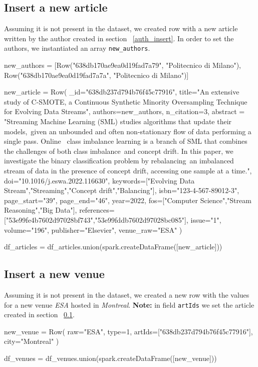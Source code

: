 \documentclass{Configuration_Files/PoliMi3i_thesis}
\begin{document}
\subsection{Insert a new article}
\label{pub_insert}
Assuming it is not present in the dataset, we created row with a new article written by the author created
in section ~\ref{auth_insert}. In order to set the authors, we instantiated an array \verb |new_authors|.\newline
\begin{python}
new_authors =  [Row("638db170ae9ea0d19fad7a79", "Politecnico di Milano"), Row("638db170ae9ea0d19fad7a7a", "Politecnico di Milano")]

new_article = Row(
    _id="638db237d794b76f45c77916",
    title="An extensive study of C-SMOTE, a Continuous Synthetic Minority Oversampling Technique for Evolving Data Streams",
    authors=new_authors,
    n_citation=3,
    abstract = "Streaming Machine Learning (SML) studies algorithms that update their models,\
        given an unbounded and often non-stationary flow of data performing a single pass. Online \
        class imbalance learning is a branch of SML that combines the challenges of both class imbalance\
        and concept drift. In this paper, we investigate the binary classification problem by rebalancing\
        an imbalanced stream of data in the presence of concept drift, accessing one sample at a time.",
        doi="10.1016/j.eswa.2022.116630",
    keywords=["Evolving Data Stream","Streaming","Concept drift","Balancing"],
    isbn="123-4-567-89012-3",
    page_start="39",
    page_end="46",
    year=2022,
    fos=["Computer Science","Stream Reasoning","Big Data"],
    references=["53e99fe4b7602d97028bf743","53e99fddb7602d97028bc085"],
    issue="1",
    volume="196",
    publisher="Elsevier",
    venue_raw="ESA"
)

df_articles = df_articles.union(spark.createDataFrame([new_article]))
\end{python}

\subsection{Insert a new venue}
Assuming it is not present in the dataset, we created a new row with the values for a new venue \emph{ESA} hosted in
\emph{Montreal}.\newline
\textbf{Note:} in field \verb |artIds| we set the article created in section ~\ref{pub_insert}.\newline
\begin{python}
new_venue = Row(
    raw="ESA",
    type=1,
    artIds=["638db237d794b76f45c77916"],
    city="Montreal"
)

df_venues = df_venues.union(spark.createDataFrame([new_venue]))
\end{python}
\end{document}
